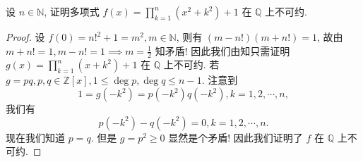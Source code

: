 \documentclass[../../main.tex]{subfiles}%
\begin{document}
\begin{example}
设 \( n \in \mathbb{N} \), 证明多项式 \( f(x) = \prod_{k=1}^n (x^2 + k^2) + 1 \) 在 \( \mathbb{Q} \) 上不可约.
\end{example}
\begin{proof}
设 \( f(0) = n!^2 + 1 = m^2, m \in \mathbb{N} \), 则有 \( (m - n!)(m + n!) = 1 \), 故由 \( m + n! = 1, m - n! = 1 \implies m = \frac{1}{2} \) 知矛盾! 因此我们由知只需证明 \( g(x) = \prod_{k=1}^n (x + k^2) + 1 \) 在 \( \mathbb{Q} \) 上不可约. 若 \( g = pq, p,q \in \mathbb{Z}[x], 1 \leqslant \deg p, \deg q \leqslant n - 1 \). 注意到
\[
1 = g(-k^2) = p(-k^2)q(-k^2), k = 1,2,\cdots,n,
\]
我们有
\[
p(-k^2) - q(-k^2) = 0, k = 1,2,\cdots,n.
\]
现在我们知道 \( p = q \). 但是 \( g = p^2 \geqslant 0 \) 显然是个矛盾! 因此我们证明了 \( f \) 在 \( \mathbb{Q} \) 上不可约.
\end{proof}
\end{document}

